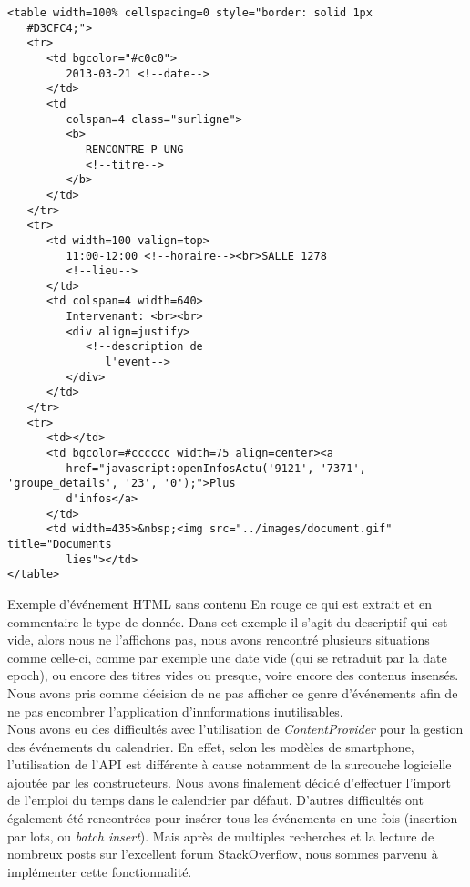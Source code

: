 \begin{adjustbox}{minipage=1.14\textwidth,margin=0pt \smallskipamount,center}
\begin{lstlisting}[style=HTML, label=htmlCode]
<table width=100% cellspacing=0 style="border: solid 1px 
   #D3CFC4;">
   <tr>
      <td bgcolor="#c0c0">
         2013-03-21 <!--date-->
      </td>
      <td
         colspan=4 class="surligne">
         <b>
            RENCONTRE P UNG
            <!--titre-->
         </b>
      </td>
   </tr>
   <tr>
      <td width=100 valign=top>
         11:00-12:00 <!--horaire--><br>SALLE 1278
         <!--lieu-->
      </td>
      <td colspan=4 width=640>
         Intervenant: <br><br>
         <div align=justify>
            <!--description de
               l'event-->
         </div>
      </td>
   </tr>
   <tr>
      <td></td>
      <td bgcolor=#cccccc width=75 align=center><a
         href="javascript:openInfosActu('9121', '7371', 'groupe_details', '23', '0');">Plus
         d'infos</a>
      </td>
      <td width=435>&nbsp;<img src="../images/document.gif" title="Documents 
         lies"></td>
</table>
\end{lstlisting}
\end{adjustbox}

Exemple d'événement HTML sans contenu
En rouge ce qui est extrait et en commentaire le type de donnée. Dans cet exemple il s'agit du descriptif qui est vide, alors nous ne l'affichons pas, nous avons rencontré plusieurs situations comme celle-ci, comme par exemple une date vide (qui se retraduit par la date epoch), ou encore des titres vides ou presque, voire encore des contenus insensés. Nous avons pris comme décision de ne pas afficher ce genre d'événements afin de ne pas encombrer l'application d'innformations inutilisables. \\

Nous avons eu des difficultés avec l’utilisation de \emph{ContentProvider} pour la gestion des événements du calendrier. En effet, selon les modèles de smartphone, l’utilisation de l’API est différente à cause notamment de la surcouche logicielle ajoutée par les constructeurs. Nous avons finalement décidé d’effectuer l’import de l’emploi du temps dans le calendrier par défaut. D’autres difficultés ont également été rencontrées pour insérer tous les événements en une fois (insertion par lots, ou \emph{batch insert}). Mais après de multiples recherches et la lecture de nombreux posts sur l’excellent forum StackOverflow, nous sommes parvenu à implémenter cette fonctionnalité.

